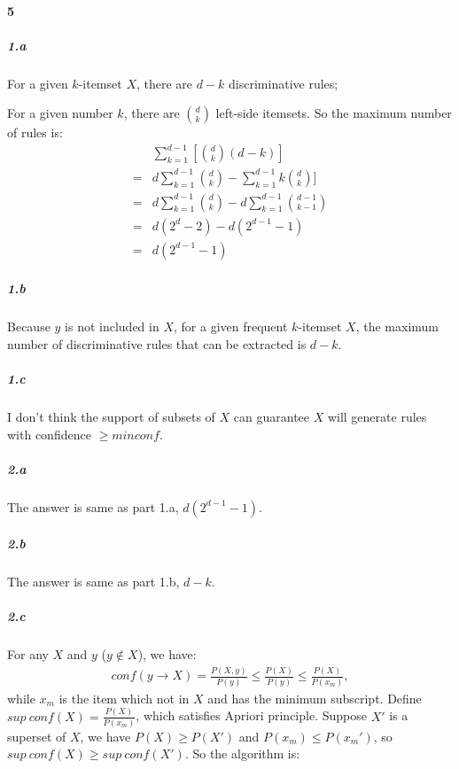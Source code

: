 \documentclass[22pt]{article}
\begin{document}
	\paragraph{5} 
	\subparagraph{1.a}
	For a given $k$-itemset $X$, there are $d-k$ discriminative rules;

	For a given number $k$, there are $\binom{d}{k}$ left-side itemsets. So the maximum number of rules is:
	\begin{align}
		& \sum\limits_{k = 1}^{d-1}[\binom{d}{k}(d-k)]\\
		= & d \sum\limits_{k = 1}^{d-1} \binom{d}{k} - \sum\limits_{k = 1}^{d-1} k \binom{d}{k}]\\
		= & d \sum\limits_{k = 1}^{d-1} \binom{d}{k} - d\sum\limits_{k = 1}^{d-1}  \binom{d-1}{k-1}\\
		= & d (2^d-2) - d(2^{d-1} -1 )\\
		= & d(2^{d-1}-1)
	\end{align}

	\subparagraph{1.b} Because $y$ is not included in $X$, for a given frequent $k$-itemset $X$, the maximum number of discriminative rules that can be extracted is $d-k$.

	\subparagraph{1.c} I don't think the support of subsets of $X$ can guarantee $X$ will generate rules with confidence $\geq minconf$.

	\subparagraph{2.a} The answer is same as part 1.a, $d(2^{d-1}-1)$. 

	\subparagraph{2.b} The answer is same as part 1.b, $d-k$.

	\subparagraph{2.c} For any $X$ and $y$ ($y\notin X$), we have:
	\begin{align}
		conf(y\rightarrow X) = \frac{P(X,y)}{P(y)} \leq \frac{P(X)}{P(y)} \leq \frac{P(X)}{P(x_m)},
	\end{align}
	while $x_m$ is the item which not in $X$ and has the minimum subscript. Define $sup\ conf(X) = \frac{P(X)}{P(x_m)}$, which satisfies Apriori principle. Suppose $X'$ is a superset of $X$, we have $P(X) \geq P(X')$ and $P(x_m) \leq P(x_m')$, so $sup\ conf(X) \geq sup\ conf(X')$. So the algorithm is:
\end{document}
